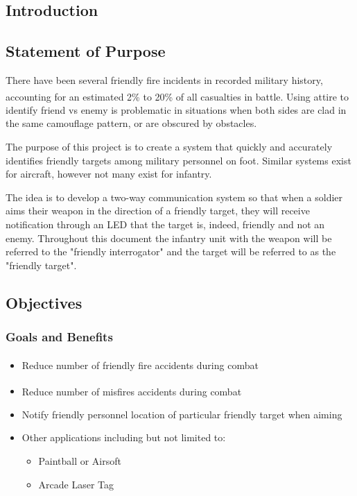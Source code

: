\documentclass[letterpaper,10pt]{article}
\newcommand{\buildtoc}{
	\clearpage
	\singlespacing
	\tableofcontents
	\onehalfspacing
}
\begin{document}
\maketitle
\pagestyle{fancy}
\begin{spacing}{1.15}


\color{black}
\buildtoc
{}
\clearpage
\setcounter{page}{1}

\section{Introduction}
\subsection{Statement of Purpose}
There have been several friendly fire incidents in recorded military history, accounting for an estimated 2\% to 20\% of all casualties in battle\textsuperscript{\cite{USArmy}}. Using attire to identify friend vs enemy is problematic in situations when both sides are clad in the same camouflage pattern, or are obscured by obstacles.

The purpose of this project is to create a system that quickly and accurately identifies friendly targets among military personnel on foot. Similar systems exist for aircraft, however not many exist for infantry.

The idea is to develop a two-way communication system so that when a soldier aims their weapon in the direction of a friendly target, they will receive notification through an LED that the target is, indeed, friendly and not an enemy. Throughout this document the infantry unit with the weapon will be referred to the "friendly interrogator" and the target will  be referred to as the "friendly target". 

\subsection{Objectives}
\subsubsection{Goals and Benefits}
\begin{itemize}
	\item Reduce number of friendly fire accidents during combat \textsuperscript{\cite{Garrison}}
	\item Reduce number of misfires accidents during combat \textsuperscript{\cite{Garrison}}
	\item Notify friendly personnel location of particular friendly target when aiming
	\item Other applications including but not limited to:
	\begin{itemize}
		\item Paintball or Airsoft
		\item Arcade Laser Tag
	\end{itemize}
\end{itemize}

\end{spacing}
\end{document}
